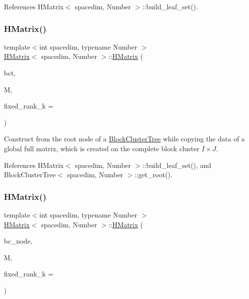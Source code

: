 References H\+Matrix$<$ spacedim, Number $>$\+::build\+\_\+leaf\+\_\+set().

\mbox{\label{classHMatrix_a8e7d103ec4f093870f9e792e26d6b915}} 
\subsubsection{\texorpdfstring{H\+Matrix()}{HMatrix()}\hspace{0.1cm}{\footnotesize\ttfamily [4/9]}}
{\footnotesize\ttfamily template$<$int spacedim, typename Number $>$ \\
\hyperlink{classHMatrix}{H\+Matrix}$<$ spacedim, Number $>$\+::\hyperlink{classHMatrix}{H\+Matrix} (\begin{DoxyParamCaption}\item[{const \hyperlink{classBlockClusterTree}{Block\+Cluster\+Tree}$<$ spacedim, Number $>$ \&}]{bct,  }\item[{const \hyperlink{classLAPACKFullMatrixExt}{L\+A\+P\+A\+C\+K\+Full\+Matrix\+Ext}$<$ Number $>$ \&}]{M,  }\item[{const unsigned int}]{fixed\+\_\+rank\+\_\+k = {} }\end{DoxyParamCaption})}

Construct from the root node of a \hyperlink{classBlockClusterTree}{Block\+Cluster\+Tree} while copying the data of a global full matrix, which is created on the complete block cluster $I \times J$. 

References H\+Matrix$<$ spacedim, Number $>$\+::build\+\_\+leaf\+\_\+set(), and Block\+Cluster\+Tree$<$ spacedim, Number $>$\+::get\+\_\+root().

\mbox{\label{classHMatrix_abb59b3981e9f32f319479088d786989d}} 
\subsubsection{\texorpdfstring{H\+Matrix()}{HMatrix()}\hspace{0.1cm}{\footnotesize\ttfamily [5/9]}}
{\footnotesize\ttfamily template$<$int spacedim, typename Number $>$ \\
\hyperlink{classHMatrix}{H\+Matrix}$<$ spacedim, Number $>$\+::\hyperlink{classHMatrix}{H\+Matrix} (\begin{DoxyParamCaption}\item[{typename \hyperlink{classBlockClusterTree}{Block\+Cluster\+Tree}$<$ spacedim, Number $>$\+::node\+\_\+const\+\_\+pointer\+\_\+type}]{bc\+\_\+node,  }\item[{const \hyperlink{classLAPACKFullMatrixExt}{L\+A\+P\+A\+C\+K\+Full\+Matrix\+Ext}$<$ Number $>$ \&}]{M,  }\item[{const unsigned int}]{fixed\+\_\+rank\+\_\+k = {} }\end{DoxyParamCaption})}

